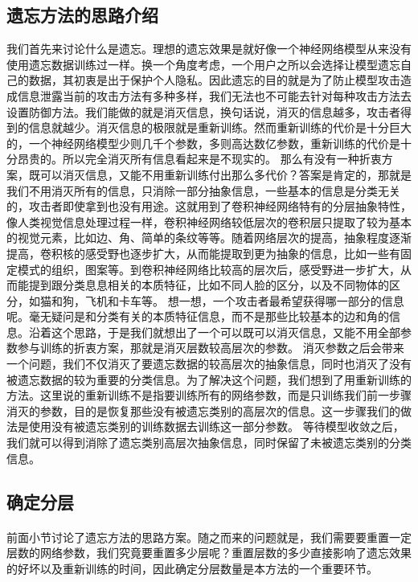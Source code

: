\subsection{遗忘方法的思路介绍}
我们首先来讨论什么是遗忘。理想的遗忘效果是就好像一个神经网络模型从来没有使用遗忘数据训练过一样。换一个角度考虑，一个用户之所以会选择让模型遗忘自己的数据，其初衷是出于保护个人隐私。因此遗忘的目的就是为了防止模型攻击造成信息泄露当前的攻击方法有多种多样，我们无法也不可能去针对每种攻击方法去设置防御方法。我们能做的就是消灭信息，换句话说，消灭的信息越多，攻击者得到的信息就越少。消灭信息的极限就是重新训练。然而重新训练的代价是十分巨大的，一个神经网络模型少则几千个参数，多则高达数亿参数，重新训练的代价是十分昂贵的。所以完全消灭所有信息看起来是不现实的。
那么有没有一种折衷方案，既可以消灭信息，又能不用重新训练付出那么多代价？答案是肯定的，那就是我们不用消灭所有的信息，只消除一部分抽象信息，一些基本的信息是分类无关的，攻击者即使拿到也没有用途。这就用到了卷积神经网络特有的分层抽象特性，像人类视觉信息处理过程一样，卷积神经网络较低层次的卷积层只提取了较为基本的视觉元素，比如边、角、简单的条纹等等。随着网络层次的提高，抽象程度逐渐提高，卷积核的感受野也逐步扩大，从而能提取到更为抽象的信息，比如一些有固定模式的组织，图案等。到卷积神经网络比较高的层次后，感受野进一步扩大，从而能提到跟分类息息相关的本质特征，比如不同人脸的区分，以及不同物体的区分，如猫和狗，飞机和卡车等。
想一想，一个攻击者最希望获得哪一部分的信息呢。毫无疑问是和分类有关的本质特征信息，而不是那些比较基本的边和角的信息。沿着这个思路，于是我们就想出了一个可以既可以消灭信息，又能不用全部参数参与训练的折衷方案，那就是消灭层数较高层次的参数。
消灭参数之后会带来一个问题，我们不仅消灭了要遗忘数据的较高层次的抽象信息，同时也消灭了没有被遗忘数据的较为重要的分类信息。为了解决这个问题，我们想到了用重新训练的方法。这里说的重新训练不是指要训练所有的网络参数，而是只训练我们前一步骤消灭的参数，目的是恢复那些没有被遗忘类别的高层次的信息。这一步骤我们的做法是使用没有被遗忘类别的训练数据去训练这一部分参数。
等待模型收敛之后，我们就可以得到消除了遗忘类别高层次抽象信息，同时保留了未被遗忘类别的分类信息。

\subsection{确定分层}
\paragraph{}前面小节讨论了遗忘方法的思路方案。随之而来的问题就是，我们需要要重置一定层数的网络参数，我们究竟要重置多少层呢？重置层数的多少直接影响了遗忘效果的好坏以及重新训练的时间，因此确定分层数量是本方法的一个重要环节。

